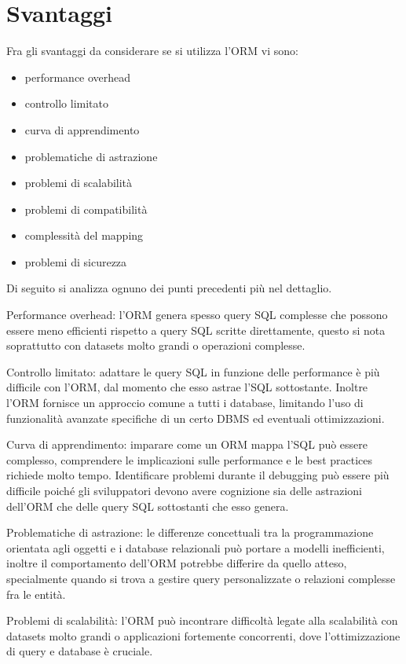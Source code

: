 \newpage

\section{Svantaggi}

Fra gli svantaggi da considerare se si utilizza l'ORM vi sono:

\begin{itemize}
\item performance overhead
\item controllo limitato
\item curva di apprendimento
\item problematiche di astrazione
\item problemi di scalabilità
\item problemi di compatibilità
\item complessità del mapping
\item problemi di sicurezza
\end{itemize}

Di seguito si analizza ognuno dei punti precedenti più nel dettaglio.

Performance overhead: l'ORM genera spesso query SQL complesse che possono essere meno efficienti rispetto a query SQL scritte direttamente, questo si nota soprattutto con datasets molto grandi o operazioni complesse.

Controllo limitato: adattare le query SQL in funzione delle performance è più difficile con l'ORM, dal momento che esso astrae l'SQL sottostante. Inoltre l'ORM fornisce un approccio comune a tutti i database, limitando l'uso di funzionalità avanzate specifiche di un certo DBMS ed eventuali ottimizzazioni.

Curva di apprendimento: imparare come un ORM mappa l'SQL può essere complesso, comprendere le implicazioni sulle performance e le best practices richiede molto tempo. Identificare problemi durante il debugging può essere più difficile poiché gli sviluppatori devono avere cognizione sia delle astrazioni dell'ORM che delle query SQL sottostanti che esso genera.

Problematiche di astrazione: le differenze concettuali tra la programmazione orientata agli oggetti e i database relazionali può portare a modelli inefficienti, inoltre il comportamento dell'ORM potrebbe differire da quello atteso, specialmente quando si trova a gestire query personalizzate o relazioni complesse fra le entità.

Problemi di scalabilità: l'ORM può incontrare difficoltà legate alla scalabilità con datasets molto grandi o applicazioni fortemente concorrenti, dove l'ottimizzazione di query e database è cruciale.

